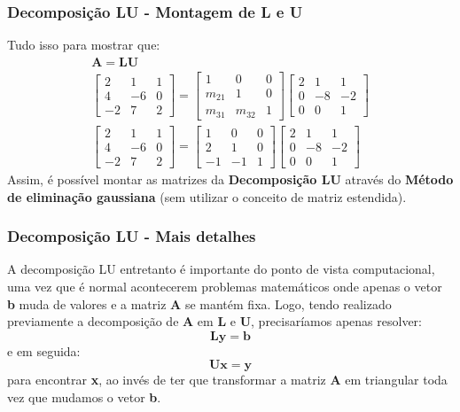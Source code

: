 \documentclass{beamer}
\theoremstyle{mystyle}
\begin{document}
\begin{frame}
	\frametitle{Decomposição LU - Montagem de L e U}
	Tudo isso para mostrar que:
	\begin{gather*}
		\mathbf{A} = \mathbf{L}\mathbf{U}\\
		\left[
		\begin{array}{ccc}
			2 & 1 & 1  \\
			4 & -6 & 0  \\
			-2 & 7 & 2
		\end{array}
		\right] 
		=
		\left[
		\begin{array}{ccc}
			1 & 0 & 0  \\
			m_{21} & 1 & 0  \\
			m_{31} & m_{32} & 1
		\end{array}
		\right]
		\left[
		\begin{array}{ccc}
			2 & 1 & 1  \\
			0 & -8 & -2  \\
			0 & 0 & 1
		\end{array}
		\right]\\ 
		\left[
		\begin{array}{ccc}
			2 & 1 & 1  \\
			4 & -6 & 0  \\
			-2 & 7 & 2
		\end{array}
		\right] 
		=
		\left[
		\begin{array}{ccc}
			1 & 0 & 0  \\
			2 & 1 & 0  \\
			-1 & -1 & 1
		\end{array}
		\right]
		\left[
		\begin{array}{ccc}
			2 & 1 & 1  \\
			0 & -8 & -2  \\
			0 & 0 & 1
		\end{array}
		\right]
	\end{gather*}
	Assim, é possível montar as matrizes da \textbf{Decomposição LU} através do \textbf{Método de eliminação gaussiana} (sem utilizar o conceito de matriz estendida).
\end{frame}

\begin{frame}
	\frametitle{Decomposição LU - Mais detalhes}
	A decomposição LU entretanto é importante do ponto de vista computacional, uma vez que é normal acontecerem problemas matemáticos onde apenas o vetor \textbf{b} muda de valores e a matriz \textbf{A} se mantém fixa.
	Logo, tendo realizado previamente a decomposição de \textbf{A} em \textbf{L} e \textbf{U}, precisaríamos apenas resolver:
	\begin{equation*}
		\mathbf{Ly} = \mathbf{b}
	\end{equation*}
	e em seguida: 
	\begin{equation*}
		\mathbf{Ux} = \mathbf{y}
	\end{equation*}
	para encontrar \textbf{x}, ao invés de ter que transformar a matriz \textbf{A} em triangular toda vez que mudamos o vetor \textbf{b}.
\end{frame}
\end{document}
